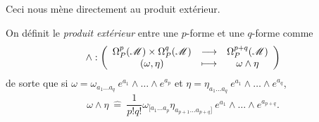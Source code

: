\documentclass[a4paper,11pt]{report}
\begin{document}
            Ceci nous mène directement au produit extérieur.
            
            \begin{defn}
                On définit le \textit{produit extérieur} entre une $p$-forme et une $q$-forme comme
                \begin{equation}
                \wedge:\left(
                \begin{array}{ccc}
                    \Omega_P^p(\mathscr{M})\times \Omega_P^q(\mathscr{M}) & \longrightarrow & \Omega_P^{p+q}(\mathscr{M}) \\
                    (\omega,\eta) & \longmapsto & \omega\wedge\eta
                \end{array}
                \right)
                \end{equation}
                de sorte que si $\omega = \omega_{a_1\dots a_q}~e^{a_1}\wedge \dots\wedge e^{a_{p}}$ et $\eta = \eta_{a_1\dots a_q}~e^{a_1}\wedge \dots\wedge e^{a_{q}}$,
                \begin{equation}
                    \omega\wedge\eta ~\hat{=}~ \frac{1}{p!q!}\omega_{[a_1\dots a_p}\eta_{a_{p+1}\dots a_{p+q}]}~e^{a_1}\wedge \dots\wedge e^{a_{p+q}}.
                \end{equation}
            \end{defn}
            
\end{document}
